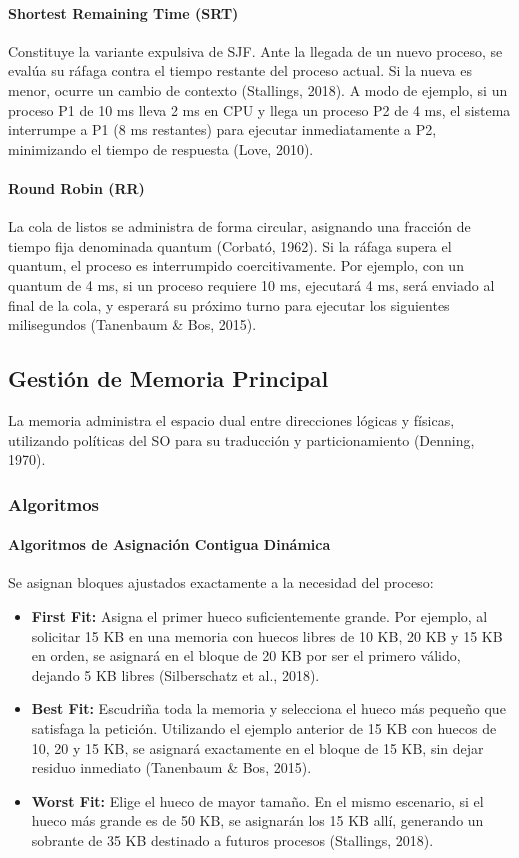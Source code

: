 \documentclass[12pt,a4paper]{article}
\begin{document}
\paragraph{Shortest Remaining Time (SRT)}
Constituye la variante expulsiva de SJF. Ante la llegada de un nuevo proceso, se evalúa su ráfaga contra el tiempo restante del proceso actual. Si la nueva es menor, ocurre un cambio de contexto (Stallings, 2018). A modo de ejemplo, si un proceso P1 de 10 ms lleva 2 ms en CPU y llega un proceso P2 de 4 ms, el sistema interrumpe a P1 (8 ms restantes) para ejecutar inmediatamente a P2, minimizando el tiempo de respuesta (Love, 2010).

\paragraph{Round Robin (RR)}
La cola de listos se administra de forma circular, asignando una fracción de tiempo fija denominada quantum (Corbató, 1962). Si la ráfaga supera el quantum, el proceso es interrumpido coercitivamente. Por ejemplo, con un quantum de 4 ms, si un proceso requiere 10 ms, ejecutará 4 ms, será enviado al final de la cola, y esperará su próximo turno para ejecutar los siguientes milisegundos (Tanenbaum \& Bos, 2015).

\subsection{Gestión de Memoria Principal}
La memoria administra el espacio dual entre direcciones lógicas y físicas, utilizando políticas del SO para su traducción y particionamiento (Denning, 1970).

\subsubsection{Algoritmos}

\paragraph{Algoritmos de Asignación Contigua Dinámica}
Se asignan bloques ajustados exactamente a la necesidad del proceso:
\begin{itemize}
    \item \textbf{First Fit:} Asigna el primer hueco suficientemente grande. Por ejemplo, al solicitar 15 KB en una memoria con huecos libres de 10 KB, 20 KB y 15 KB en orden, se asignará en el bloque de 20 KB por ser el primero válido, dejando 5 KB libres (Silberschatz et al., 2018).
    \item \textbf{Best Fit:} Escudriña toda la memoria y selecciona el hueco más pequeño que satisfaga la petición. Utilizando el ejemplo anterior de 15 KB con huecos de 10, 20 y 15 KB, se asignará exactamente en el bloque de 15 KB, sin dejar residuo inmediato (Tanenbaum \& Bos, 2015).
    \item \textbf{Worst Fit:} Elige el hueco de mayor tamaño. En el mismo escenario, si el hueco más grande es de 50 KB, se asignarán los 15 KB allí, generando un sobrante de 35 KB destinado a futuros procesos (Stallings, 2018).
\end{itemize}
\end{document}
